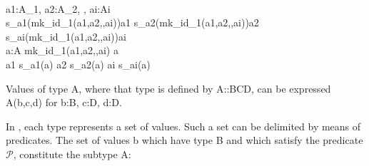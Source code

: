 {%
\bp
{}\\
\>{\ALL} a1:A\_1, a2:A\_2, {\DOTDOTDOT}, ai:Ai {\RDOT}\\
\>\>s\_a1(mk\_id\_1(a1,a2,{\DOTDOTDOT},ai)){\EQ}a1 {\WEDGE} s\_a2(mk\_id\_1(a1,a2,{\DOTDOTDOT},ai)){\EQ}a2 {\WEDGE}\\
\>\>{\DOTDOTDOT} {\WEDGE} s\_ai(mk\_id\_1(a1,a2,{\DOTDOTDOT},ai)){\EQ}ai {\WEDGE} \\
\>{\ALL} a:A {\RDOT}  mk\_id\_1(a1{\PRIM},a2{\PRIM},{\DOTDOTDOT},ai{\PRIM}) {\EQ} a  \\
\>\>a1{\PRIM} {\EQ} s\_a1(a) {\WEDGE} a2{\PRIM} {\EQ} s\_a2(a) {\WEDGE} {\DOTDOTDOT} {\WEDGE} ai{\PRIM} {\EQ} s\_ai(a)  
\ep
}

\noindent
{}\label{note-on-mk-type}
\begynd
\pind Values of type \textsf{A},
\pind where that type is defined by \textsf{A::B{\TIMES}C{\TIMES}D},
\pind can be expressed \textsf{A(b,c,d)} for \textsf{b:B, c:D, d:D}.
\afslut

\label{tseb.rsl.Subtypes}%

\begynd
\pind In {\dbrsl}, each type represents a set of values. Such a set can be
      delimited by means of predicates.
\pind The set of values \textsf{b} which have type \textsf{B} and which
      satisfy the predicate $\mathcal{P}$, constitute the subtype A: 
\afslut


\noindent
{}%

